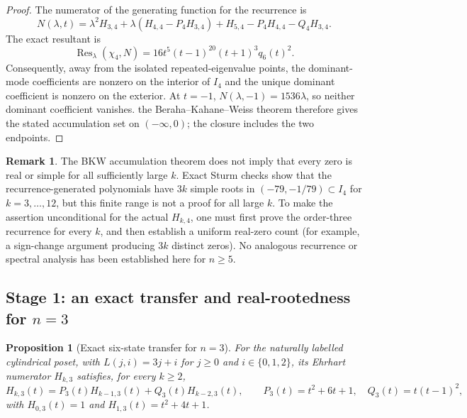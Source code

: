 \documentclass[11pt,a4paper]{article}
\newtheorem{proposition}[theorem]{Proposition}
\theoremstyle{definition}
\newtheorem{remark}[theorem]{Remark}
\begin{document}
\begin{proof}
The numerator of the generating function for the recurrence is
\[
N(\lambda,t)=\lambda^2H_{3,4}
+\lambda(H_{4,4}-P_4H_{3,4})
+H_{5,4}-P_4H_{4,4}-Q_4H_{3,4}.
\]
The exact resultant is
\[
\operatorname{Res}_\lambda(\chi_4,N)
=16t^5(t-1)^{20}(t+1)^3q_6(t)^2.
\]
Consequently, away from the isolated repeated-eigenvalue points, the
dominant-mode coefficients are nonzero on the interior of $I_4$ and
the unique dominant coefficient is nonzero on the exterior. At
$t=-1$, $N(\lambda,-1)=1536\lambda$, so neither dominant coefficient
vanishes. the Beraha--Kahane--Weiss theorem \cite{BerahaKahaneWeiss1975} therefore gives the stated
accumulation set on $(-\infty,0)$; the closure includes the two
endpoints.
\end{proof}

\begin{remark}
The BKW accumulation theorem does not imply that every zero is real or
simple for all sufficiently large $k$. Exact Sturm checks show that
the recurrence-generated polynomials have $3k$ simple roots in
$(-79,-1/79)\subset I_4$ for $k=3,\ldots,12$, but this finite range is
not a proof for all large $k$. To make the assertion unconditional for
the actual $H_{k,4}$, one must first prove the order-three recurrence
for every $k$, and then establish a uniform real-zero count (for
example, a sign-change argument producing $3k$ distinct zeros).
No analogous recurrence or spectral analysis has been established here
for $n\ge5$.
\end{remark}

\subsection[Stage 1: exact transfer and real-rootedness for n=3]{Stage 1: an exact transfer and real-rootedness for $n=3$}
\label{sec:n3-real-rooted}

\begin{proposition}[Exact six-state transfer for $n=3$]
\label{prop:n3-transfer}
For the naturally labelled cylindrical poset, with
$L(j,i)=3j+i$ for $j\ge0$ and $i\in\{0,1,2\}$, its Ehrhart numerator
$H_{k,3}$ satisfies, for every $k\ge2$,
\[
H_{k,3}(t)=P_3(t)H_{k-1,3}(t)+Q_3(t)H_{k-2,3}(t),
\qquad P_3(t)=t^2+6t+1,\quad Q_3(t)=t(t-1)^2,
\]
with $H_{0,3}(t)=1$ and $H_{1,3}(t)=t^2+4t+1$.
\end{proposition}
\end{document}
